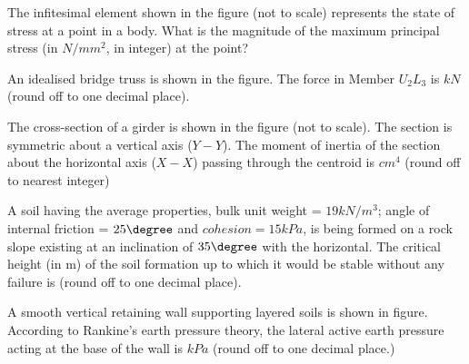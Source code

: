 \iffalse	
	\chapter{2011}
	\author{AI24BTECH11016}
	\section{me}
\fi

\item
	The infitesimal element shown in the figure (not to scale) represents the state of stress at a point in a body. What is the magnitude of the maximum principal stress (in $N/mm^{2}$, in integer) at the point?
	
    		
    		
	\item
	An idealised bridge truss is shown in the figure. The force in Member $U_{2}L_{3}$ is $kN$(round off to one decimal place).
		
	
    		
    		
	\item 
	The cross-section of a girder is shown in the figure (not to scale). The section is symmetric about a vertical axis ($Y-Y$). The moment of inertia of the section about the horizontal axis ($X-X$) passing through the centroid is $cm^{4}$ (round off to nearest integer)
	
    		
    		
	\item
	A soil having the average properties, bulk unit weight = $19 kN/m^{3}$; angle of internal friction = $25 \degree $ and $cohesion = 15 kPa$, is being formed on a rock slope existing at an inclination of $35 \degree $ with the horizontal. The critical height (in m) of the soil formation up to which it would be stable without any failure is (round off to one decimal place).
	\\
	\item
	A smooth vertical retaining wall supporting layered soils is shown in figure. According to Rankine's earth pressure theory, the lateral active earth pressure acting at the base of the wall is $kPa$ (round off to one decimal place.)
	
    		
    		
